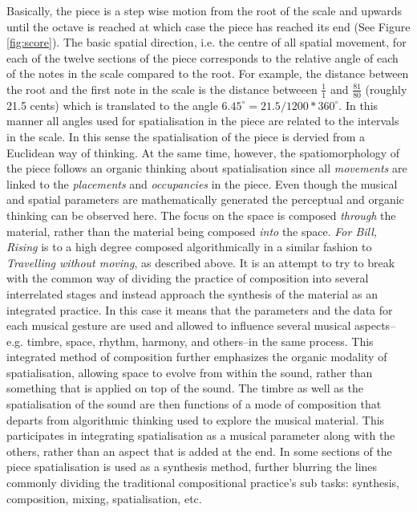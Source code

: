 \documentclass{article}
\begin{document}
     Basically, the piece is a step wise motion from the root of the scale and upwards until the octave is reached at which case the piece has reached its end (See Figure \ref{fig:score}). The basic spatial direction, i.e. the centre of all spatial movement, for each of the twelve sections of the piece corresponds to the relative angle of each of the notes in the scale compared to the root. For example, the distance between the root and the first note in the scale is the distance betweeen $\frac{1}{1}$ and $\frac{81}{80}$ (roughly 21.5 cents) which is translated to the angle $6.45^{\circ} = 21.5/1200*360^{\circ}$. 
     In this manner all angles used for spatialisation in the piece are related to the intervals in the scale. In this sense the spatialisation of the piece is dervied from a Euclidean way of thinking. 
     At the same time, however, the spatiomorphology of the piece follows an organic thinking about spatialisation since all \textit{movements} are linked to the \textit{placements} and \textit{occupancies} in the piece.
     Even though the musical and spatial parameters are mathematically generated the perceptual and organic thinking can be observed here. 
     The focus on the space is composed \textit{through} the material, rather than the material being composed \textit{into} the space.
     \textit{For Bill, Rising} is to a high degree composed algorithmically in a similar fashion to \textit{Travelling without moving}, as described above.  
     It is an attempt to try to break with the common way of dividing the practice of composition into several interrelated stages and instead approach the synthesis of the material as an integrated practice.
     In this case it means that the parameters and the data for each musical gesture are used and allowed to influence several musical aspects--e.g. timbre, space, rhythm, harmony, and others--in the same process. 
     This integrated method of composition further emphasizes the organic modality of spatialisation, allowing space to evolve from within the sound, rather than something that is applied on top of the sound. 
     The timbre as well as the spatialisation of the sound are then functions of a mode of composition that departs from algorithmic thinking used to explore the musical material. 
     This participates in integrating spatialisation as a musical parameter along with the others, rather than an aspect that is added at the end. 
     In some sections of the piece spatialisation is used as a synthesis method, further blurring the lines commonly dividing the traditional compositional practice's sub tasks: synthesis, composition, mixing, spatialisation, etc.
\end{document}
